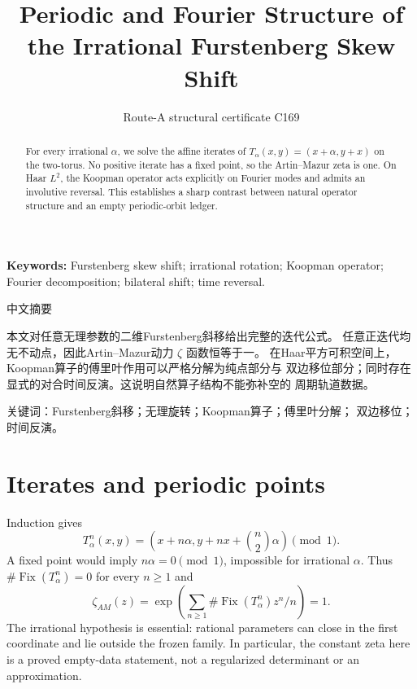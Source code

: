 \documentclass[10pt]{article}
\title{Periodic and Fourier Structure of the Irrational Furstenberg Skew Shift}
\author{Route-A structural certificate C169}
\date{}
\begin{document}
\maketitle
\begin{abstract}
For every irrational $\alpha$, we solve the affine iterates of
$T_\alpha(x,y)=(x+\alpha,y+x)$ on the two-torus.  No positive iterate has a
fixed point, so the Artin--Mazur zeta is one.  On Haar $L^2$, the Koopman
operator acts explicitly on Fourier modes and admits an involutive reversal.
This establishes a sharp contrast between natural operator structure and an
empty periodic-orbit ledger.
\end{abstract}
\noindent\textbf{Keywords:} Furstenberg skew shift; irrational rotation;
Koopman operator; Fourier decomposition; bilateral shift; time reversal.

\begin{otherlanguage}{chinese-simplified}
\begin{center}{\large 中文摘要}\end{center}
本文对任意无理参数的二维\foreignlanguage{english}{Furstenberg}斜移给出完整的迭代公式。
任意正迭代均无不动点，因此\foreignlanguage{english}{Artin--Mazur}动力 $\zeta$ 函数恒等于一。
在\foreignlanguage{english}{Haar}平方可积空间上，\foreignlanguage{english}{Koopman}算子的傅里叶作用可以严格分解为纯点部分与
双边移位部分；同时存在显式的对合时间反演。这说明自然算子结构不能弥补空的
周期轨道数据。

\noindent 关键词：\foreignlanguage{english}{Furstenberg}斜移；无理旋转；\foreignlanguage{english}{Koopman}算子；傅里叶分解；
双边移位；时间反演。
\end{otherlanguage}
\section{Iterates and periodic points}
Induction gives
\[
T_\alpha^n(x,y)=\left(x+n\alpha,
y+nx+\binom n2\alpha\right)\pmod1.
\]
A fixed point would imply $n\alpha=0\pmod1$, impossible for irrational
$\alpha$.  Thus $\#\operatorname{Fix}(T_\alpha^n)=0$ for every $n\ge1$ and
\[
\zeta_{AM}(z)=\exp\!\left(\sum_{n\ge1}
\#\operatorname{Fix}(T_\alpha^n)z^n/n\right)=1.
\]
The irrational hypothesis is essential: rational parameters can close in the
first coordinate and lie outside the frozen family.  In particular, the
constant zeta here is a proved empty-data statement, not a regularized
determinant or an approximation.
\end{document}

